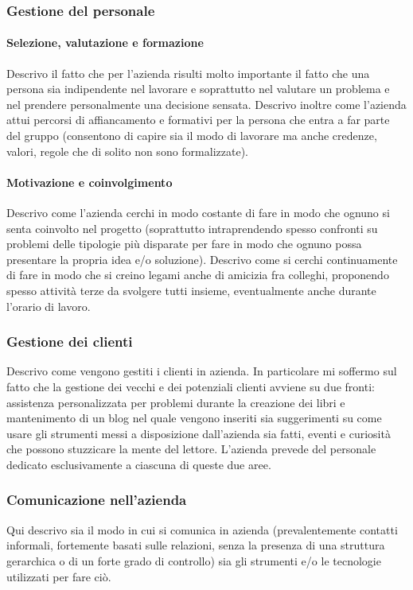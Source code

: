 			\subsubsection{Gestione del personale}
				\paragraph{Selezione, valutazione e formazione}
					Descrivo il fatto che per l'azienda risulti molto importante il fatto che una persona sia indipendente nel
					lavorare e soprattutto nel valutare un problema e nel prendere personalmente una decisione sensata.
					Descrivo inoltre come l'azienda attui percorsi di affiancamento e formativi per la persona che entra a far
					parte del gruppo (consentono di capire sia il modo di lavorare ma anche credenze, valori, regole che di
					solito non sono formalizzate).
				\paragraph{Motivazione e coinvolgimento}
					Descrivo come l'azienda cerchi in modo costante di fare in modo che ognuno si senta coinvolto nel progetto
					(soprattutto intraprendendo spesso confronti su problemi delle tipologie più disparate per fare in modo che
					ognuno possa presentare la propria idea e/o soluzione).
					Descrivo come si cerchi continuamente di fare in modo che si creino legami anche di amicizia fra colleghi,
					proponendo spesso attività terze da svolgere tutti insieme, eventualmente anche durante l'orario di lavoro.
			\subsubsection{Gestione dei clienti}
				Descrivo come vengono gestiti i clienti in azienda. In particolare mi soffermo sul fatto che la gestione dei vecchi
				e dei potenziali clienti avviene su due fronti: assistenza personalizzata per problemi durante la creazione dei libri
				e mantenimento di un blog nel quale vengono inseriti sia suggerimenti su come usare gli strumenti messi a
				disposizione dall'azienda sia fatti, eventi e curiosità che possono stuzzicare la mente del lettore. L'azienda
				prevede del personale dedicato esclusivamente a ciascuna di queste due aree.
			\subsubsection{Comunicazione nell'azienda}
				Qui descrivo sia il modo in cui si comunica in azienda (prevalentemente contatti informali, fortemente basati sulle
				relazioni, senza la presenza di una struttura gerarchica o di un forte grado di controllo) sia gli strumenti e/o le
				tecnologie utilizzati per fare ciò.
